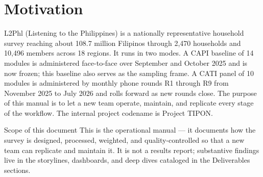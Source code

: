 
\section*{Motivation}

L2Phl (Listening to the Philippines) is a nationally representative household
survey reaching about 108.7 million Filipinos through 2,470 households and
10,496 members across 18 regions. It runs in two modes. A CAPI baseline of 14
modules is administered face-to-face over September and October 2025 and is now
frozen; this baseline also serves as the sampling frame. A CATI panel of 10
modules is administered by monthly phone rounds R1 through R9 from November 2025
to July 2026 and rolls forward as new rounds close. The purpose of this manual
is to let a new team operate, maintain, and replicate every stage of the
workflow. The internal project codename is Project TIPON.

\begin{notebox}{Scope of this document}
This is the operational manual --- it documents how the survey is designed,
processed, weighted, and quality-controlled so that a new team can replicate and
maintain it. It is not a results report; substantive findings live in the
storylines, dashboards, and deep dives cataloged in the Deliverables sections.
\end{notebox}
